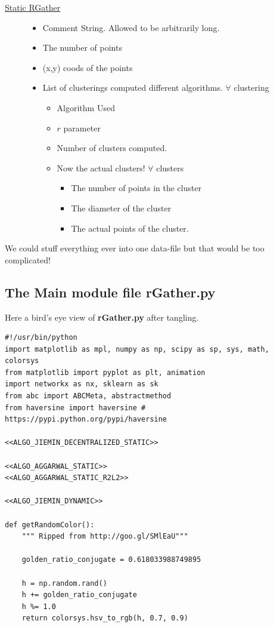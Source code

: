 \documentclass[11pt]{article}
\begin{document}
\begin{description}
\item[{\uline{Static RGather}}] \begin{itemize}
\item Comment String. Allowed to be arbitrarily long.
\item The number of points
\item (x,y) coods of the points
\item List of clusterings computed different algorithms. 
$\forall$ clustering
\begin{itemize}
\item Algorithm Used
\item $r$ parameter
\item Number of clusters computed.
\item Now the actual clusters! 
$\forall$ clusters
\begin{itemize}
\item The number of points in the cluster
\item The diameter of the cluster
\item The actual points of the cluster.
\end{itemize}
\end{itemize}
\end{itemize}
\end{description}

We could stuff everything ever into one 
data-file but that would be too complicated! 




\subsection{The Main module file rGather.py}
\label{sec-3-1}

Here a bird's eye view of \textbf{rGather.py} after tangling.  

\begin{verbatim}
#!/usr/bin/python
import matplotlib as mpl, numpy as np, scipy as sp, sys, math, colorsys 
from matplotlib import pyplot as plt, animation 
import networkx as nx, sklearn as sk
from abc import ABCMeta, abstractmethod
from haversine import haversine # https://pypi.python.org/pypi/haversine

<<ALGO_JIEMIN_DECENTRALIZED_STATIC>>

<<ALGO_AGGARWAL_STATIC>>
<<ALGO_AGGARWAL_STATIC_R2L2>> 

<<ALGO_JIEMIN_DYNAMIC>>

def getRandomColor():
    """ Ripped from http://goo.gl/SMlEaU"""

    golden_ratio_conjugate = 0.618033988749895

    h = np.random.rand() 
    h += golden_ratio_conjugate
    h %= 1.0
    return colorsys.hsv_to_rgb(h, 0.7, 0.9)
\end{verbatim}
\end{document}
